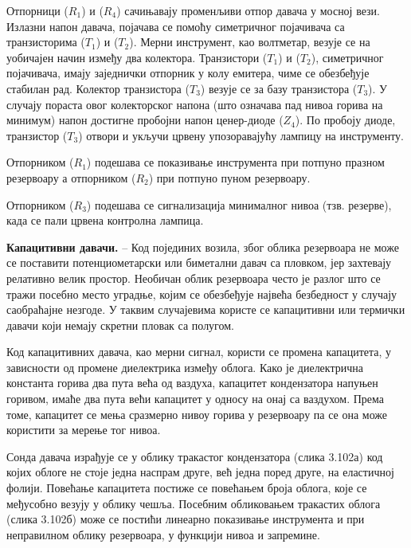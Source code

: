 \documentclass[12pt,a4paper]{report}
\begin{document}
Отпорници ($R_1$) и ($R_4$) сачињавају променљиви отпор давача у мосној вези. Излазни напон давача, појачава се помоћу симетричног појачивача са транзисторима ($T_1$) и ($T_2$). Мерни инструмент, као волтметар, везује се на уобичајен начин између два колектора. Транзистори ($T_1$) и ($T_2$), симетричног појачивача, имају заједнички отпорник у колу емитера, чиме се обезбеђује стабилан рад. Колектор транзистора ($T_3$) везује се за базу транзистора ($T_3$). У случају пораста овог колекторског напона (што означава пад нивоа горива на минимум) напон достигне пробојни напон ценер-диоде ($Z_4$). По пробоју диоде, транзистор ($T_3$) отвори и укључи црвену упозоравајућу лампицу на инструменту.

Отпорником ($R_1$) подешава се показивање инструмента при потпуно празном резервоару а отпорником ($R_2$) при потпуно пуном резервоару.

Отпорником ($R_3$) подешава се сигнализација минималног нивоа (тзв. резерве), када се пали црвена контролна лампица.

\textbf{Капацитивни давачи.} – Код појединих возила, због облика резервоара не може се поставити потенциометарски или биметални давач са пловком, јер захтевају релативно велик простор. Необичан облик резервоара често је разлог што се тражи посебно место уградње, којим се обезбеђује највећа безбедност у случају саобраћајне незгоде. У таквим случајевима користе се капацитивни или термички давачи који немају скретни пловак са полугом.

Код капацитивних давача, као мерни сигнал, користи се промена капацитета, у зависности од промене диелектрика између облога. Како је диелектрична константа горива два пута већа од ваздуха, капацитет кондензатора напуњен горивом, имаће два пута већи капацитет у односу
на онај са ваздухом. Према томе, капацитет се мења сразмерно нивоу горива у резервоару па се она може користити за мерење тог нивоа.

Сонда давача израђује се у облику тракастог кондензатора (слика 3.102а) код којих облоге не стоје једна наспрам друге, већ једна поред друге, на еластичној фолији. Повећање капацитета постиже се повећањем броја облога, које се међусобно везују у облику чешља. Посебним обликовањем тракастих облога (слика 3.102б) може се постићи линеарно показивање инструмента и при неправилном облику резервоара, у функцији нивоа и запремине.

\end{document}
